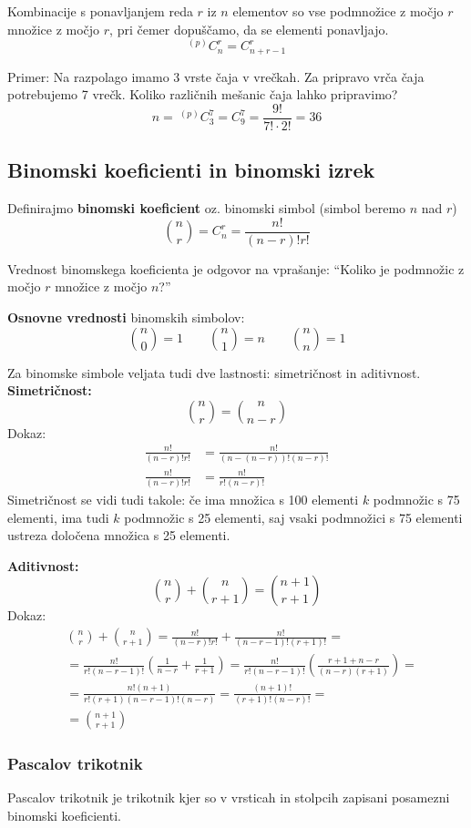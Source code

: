 \documentclass[a4paper,oneside,12pt,fleqn]{article}
\newcommand\krat\cdot
\numberwithin{equation}{section}
\begin{document}
Kombinacije s ponavljanjem reda $r$ iz $n$ elementov so vse podmnožice z močjo $r$ množice
z močjo $r$, pri čemer dopuščamo, da se elementi ponavljajo.
\[ ^{(p)}C_n^r = C_{n+r-1}^r \]

Primer: Na razpolago imamo 3 vrste čaja v vrečkah. Za pripravo vrča čaja
potrebujemo 7 vrečk. Koliko različnih mešanic čaja lahko pripravimo?
\[ n =\ ^{(p)}C_3^7 = C_9^7 = \frac{9!}{7!\krat 2!} = 36 \]

\subsection{Binomski koeficienti in binomski izrek}
\label{sec:komb:bin}

Definirajmo \textbf{binomski koeficient} oz. binomski simbol (simbol beremo $n$ nad $r$)
\[ \binom{n}{r} = C^r_n = \frac{n!}{(n-r)!r!} \]

Vrednost binomskega koeficienta je odgovor na vprašanje: ``Koliko je podmnožic z močjo $r$
množice z močjo $n$?''

\textbf{Osnovne vrednosti} binomskih simbolov:
\[ \binom{n}{0} = 1 \qquad \binom{n}{1} = n \qquad \binom{n}{n} = 1 \]

Za binomske simbole veljata tudi dve lastnosti: simetričnost in aditivnost. \\
\textbf{Simetričnost:}
\[ \binom{n}{r} = \binom{n}{n-r} \]
Dokaz:
\begin{align*}
  \frac{n!}{(n-r)!r!} &= \frac{n!}{(n-(n-r))!(n-r)!} \\
  \frac{n!}{(n-r)!r!} &= \frac{n!}{r!(n-r)!}
\end{align*}
Simetričnost se vidi tudi takole: če ima množica s 100 elementi $k$ podmnožic s 75 elementi, ima
tudi $k$ podmnožic s 25 elementi, saj vsaki podmnožici s 75 elementi ustreza določena množica s 25
elementi.

\textbf{Aditivnost:}
\[ \binom{n}{r} + \binom{n}{r+1} = \binom{n+1}{r+1} \]
Dokaz:
\begin{align*}
  &\binom{n}{r} + \binom{n}{r+1} = \frac{n!}{(n-r)!r!} + \frac{n!}{(n-r-1)!(r+1)!} = \\
  &= \frac{n!}{r!(n-r-1)!}\left( \frac{1}{n-r} + \frac{1}{r+1} \right) =
  \frac{n!}{r!(n-r-1)!}\left( \frac{r+1+n-r}{(n-r)(r+1)} \right) = \\
  &= \frac{n!(n+1)}{r!(r+1)(n-r-1)!(n-r)} = \frac{(n+1)!}{(r+1)!(n-r)!} = \\
  &= \binom{n+1}{r+1}
\end{align*}

\subsubsection{Pascalov trikotnik}
\label{sec:komb:bin:pasc}
Pascalov trikotnik je trikotnik kjer so v vrsticah in stolpcih zapisani posamezni binomski koeficienti.
\end{document}
